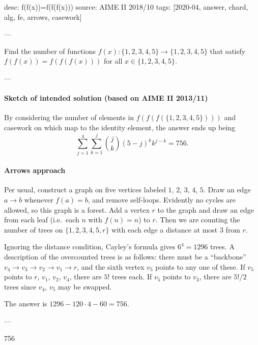 desc: f(f(x))=f(f(f(x)))
source: AIME II 2018/10
tags: [2020-04, answer, chard, alg, fe, arrows, casework]

---

Find the number of functions $f(x):\{1,2,3,4,5\}\to\{1,2,3,4,5\}$ that satisfy $f(f(x))=f(f(f(x)))$ for all $x\in\{1,2,3,4,5\}$.

---

\paragraph{Sketch of intended solution (based on AIME II 2013/11)} By considering the number of elements in $f(f(f(\{1,2,3,4,5\})))$ and casework on which map to the identity element, the answer ends up being \[\sum_{j=1}^4\sum_{k=1}^j \binom{j}{k}(5-j)^k k^{j-k}=756.\]

\paragraph{Arrows approach} Per usual, construct a graph on five vertices labeled $1$, $2$, $3$, $4$, $5$. Draw an edge $a\to b$ whenever $f(a)=b$, and remove self-loops. Evidently no cycles are allowed, so this graph is a forest. Add a vertex $r$ to the graph and draw an edge from each leaf (i.e.\ each $n$ with $f(n)=n$) to $r$. Then we are counting the number of trees on $\{1,2,3,4,5,r\}$ with each edge a distance at most $3$ from $r$.

Ignoring the distance condition, Cayley's formula gives $6^4=1296$ trees. A description of the overcounted trees is as follows: there must be a ``backbone'' $v_4\to v_3\to v_2\to v_1\to r$, and the sixth vertex $v_5$ points to any one of these. If $v_5$ points to $r$, $v_1$, $v_2$, $v_4$, there are $5!$ trees each. If $v_5$ points to $v_3$, there are $5!/2$ trees since $v_4$, $v_5$ may be swapped.

The answer is $1296-120\cdot4-60=756$.

---

756

